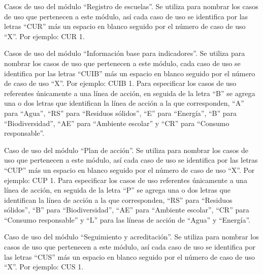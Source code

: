 	\begin{description}


	     Casos de uso del módulo ``Registro de escuelas''. Se utiliza para nombrar los casos de uso que pertenecen a este módulo, así cada caso de uso se identifica por las letras ``CUR'' más un espacio en blanco seguido por el número de caso de uso ``X''. Por ejemplo: CUR 1.

	     Casos de uso del módulo ``Información base para indicadores''. Se utiliza para nombrar los casos de uso que pertenecen a este módulo, cada caso de uso se identifica por las letras ``CUIB'' más un espacio en blanco seguido por el número de caso de uso ``X''. Por ejemplo: CUIB 1. Para especificar los casos de uso referentes únicamente a una línea de acción, en seguida de la letra ``B'' se agrega una o dos letras que identifican la línea de acción a la que corresponden, ``A'' para ``Agua'', ``RS'' para ``Residuos sólidos'', ``E'' para ``Energía'',  ``B'' para ``Biodiversidad'',  ``AE'' para ``Ambiente escolar'' y  ``CR'' para ``Consumo responsable''.

	     Caso de uso del módulo ``Plan de acción''. Se utiliza para nombrar los casos de uso que pertenecen a este módulo, así cada caso de uso se identifica por las letras ``CUP'' más un espacio en blanco seguido por el número de caso de uso ``X''. Por ejemplo: CUP 1. Para especificar los casos de uso referentes únicamente a una línea de acción, en seguida de la letra ``P'' se agrega una o dos letras que identifican la línea de acción a la que corresponden,  ``RS'' para ``Residuos sólidos'', ``B'' para ``Biodiversidad'',  ``AE'' para ``Ambiente escolar'', ``CR'' para ``Consumo responsable'' y ``L'' para las líneas de acción de ``Agua'' y ``Energía''.

	     Caso de uso del módulo ``Seguimiento y acreditación''. Se utiliza para nombrar los casos de uso que pertenecen a este módulo, así cada caso de uso se identifica por las letras ``CUS'' más un espacio en blanco seguido por el número de caso de uso ``X''. Por ejemplo: CUS 1.


\end{description}

